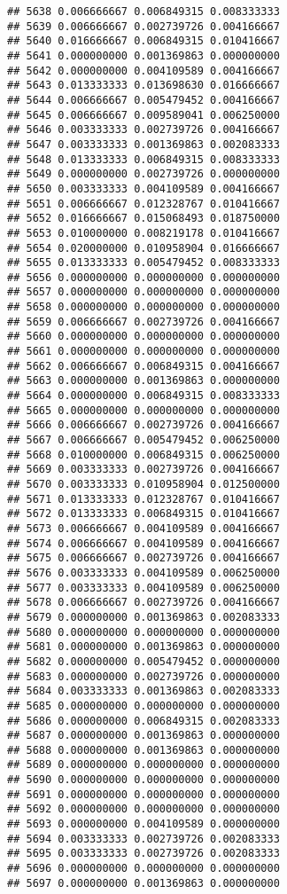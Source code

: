 \documentclass[
]{article}
\begin{document}
\begin{verbatim}
## 5638 0.006666667 0.006849315 0.008333333
## 5639 0.006666667 0.002739726 0.004166667
## 5640 0.016666667 0.006849315 0.010416667
## 5641 0.000000000 0.001369863 0.000000000
## 5642 0.000000000 0.004109589 0.004166667
## 5643 0.013333333 0.013698630 0.016666667
## 5644 0.006666667 0.005479452 0.004166667
## 5645 0.006666667 0.009589041 0.006250000
## 5646 0.003333333 0.002739726 0.004166667
## 5647 0.003333333 0.001369863 0.002083333
## 5648 0.013333333 0.006849315 0.008333333
## 5649 0.000000000 0.002739726 0.000000000
## 5650 0.003333333 0.004109589 0.004166667
## 5651 0.006666667 0.012328767 0.010416667
## 5652 0.016666667 0.015068493 0.018750000
## 5653 0.010000000 0.008219178 0.010416667
## 5654 0.020000000 0.010958904 0.016666667
## 5655 0.013333333 0.005479452 0.008333333
## 5656 0.000000000 0.000000000 0.000000000
## 5657 0.000000000 0.000000000 0.000000000
## 5658 0.000000000 0.000000000 0.000000000
## 5659 0.006666667 0.002739726 0.004166667
## 5660 0.000000000 0.000000000 0.000000000
## 5661 0.000000000 0.000000000 0.000000000
## 5662 0.006666667 0.006849315 0.004166667
## 5663 0.000000000 0.001369863 0.000000000
## 5664 0.000000000 0.006849315 0.008333333
## 5665 0.000000000 0.000000000 0.000000000
## 5666 0.006666667 0.002739726 0.004166667
## 5667 0.006666667 0.005479452 0.006250000
## 5668 0.010000000 0.006849315 0.006250000
## 5669 0.003333333 0.002739726 0.004166667
## 5670 0.003333333 0.010958904 0.012500000
## 5671 0.013333333 0.012328767 0.010416667
## 5672 0.013333333 0.006849315 0.010416667
## 5673 0.006666667 0.004109589 0.004166667
## 5674 0.006666667 0.004109589 0.004166667
## 5675 0.006666667 0.002739726 0.004166667
## 5676 0.003333333 0.004109589 0.006250000
## 5677 0.003333333 0.004109589 0.006250000
## 5678 0.006666667 0.002739726 0.004166667
## 5679 0.000000000 0.001369863 0.002083333
## 5680 0.000000000 0.000000000 0.000000000
## 5681 0.000000000 0.001369863 0.000000000
## 5682 0.000000000 0.005479452 0.000000000
## 5683 0.000000000 0.002739726 0.000000000
## 5684 0.003333333 0.001369863 0.002083333
## 5685 0.000000000 0.000000000 0.000000000
## 5686 0.000000000 0.006849315 0.002083333
## 5687 0.000000000 0.001369863 0.000000000
## 5688 0.000000000 0.001369863 0.000000000
## 5689 0.000000000 0.000000000 0.000000000
## 5690 0.000000000 0.000000000 0.000000000
## 5691 0.000000000 0.000000000 0.000000000
## 5692 0.000000000 0.000000000 0.000000000
## 5693 0.000000000 0.004109589 0.000000000
## 5694 0.003333333 0.002739726 0.002083333
## 5695 0.003333333 0.002739726 0.002083333
## 5696 0.000000000 0.000000000 0.000000000
## 5697 0.000000000 0.001369863 0.000000000

\end{verbatim}
\end{document}
